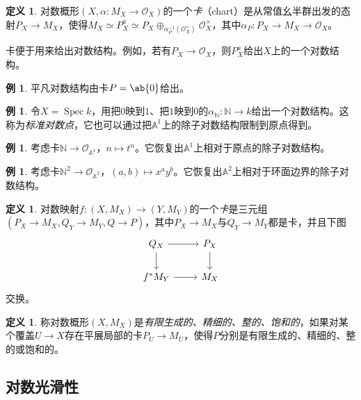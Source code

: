 \documentclass{amsart}
\theoremstyle{definition}
\newtheorem{defn}[thm]{定义}
\newtheorem{exm}[thm]{例}
\theoremstyle{remark}
\theoremstyle{plain}
\theoremstyle{definition}
\theoremstyle{remark}
\newcommand{\A}{\mathbb{A}}
\newcommand{\N}{\mathbb{N}}
\newcommand{\mc}[1]{\mathcal{#1}}
\newcommand{\1}{\mathbf{1}}
\newcommand{\2}{\mathbf{2}}
\newcommand{\3}{\mathbf{3}}
\DeclareMathOperator{\Spec}{Spec}
\begin{document}
\begin{defn}
    对数概形\((X, \alpha \colon M_X \to \mc{O}_X)\)的一个\textit{卡}（chart）是从常值幺半群出发的态射\(P_X \to M_X\)，使得\(M_X \simeq P_X^a \simeq P_X \oplus_{\alpha_P^{-1}(\mc{O}_X^{\times})} \mc{O}_X^{\times}\)，其中\(\alpha_P \colon P_X \to M_X \to \mc{O}_X\)。
\end{defn}

卡便于用来给出对数结构。例如，若有\(P_X \to \mc{O}_X\)，则\(P_X^a\)给出\(X\)上的一个对数结构。

\begin{exm}
    平凡对数结构由卡\(P = \ab\{0\}\)给出。
\end{exm}

\begin{exm}
    令\(X = \Spec k\)，用把\(0\)映到\(1\)、把\(1\)映到\(0\)的\(\alpha_{\N} \colon \N \to k\)给出一个对数结构。这称为\textit{标准对数点}，它也可以通过把\(\A^1\)上的除子对数结构限制到原点得到。
\end{exm}

\begin{exm}
    考虑卡\(\N \to \mc{O}_{\A^1}\)，\(n \mapsto t^n\)。它恢复出\(\A^1\)上相对于原点的除子对数结构。
\end{exm}

\begin{exm}
    考虑卡\(\N^2 \to \mc{O}_{\A^2}\)，\((a,b) \mapsto x^a y^b\)。它恢复出\(\A^2\)上相对于环面边界的除子对数结构。
\end{exm}

\begin{defn}
    对数映射\(f \colon (X, M_X) \to (Y, M_Y)\)的一个\textit{卡}是三元组\((P_X\to M_X, Q_Y \to M_Y, Q \to P)\)，其中\(P_X \to M_X\)与\(Q_Y \to M_Y\)都是卡，并且下图
    \begin{equation*}
    \begin{tikzcd}
        Q_X \ar{r} \ar{d} & P_X \ar{d} \\
        f^* M_Y \ar{r} & M_X
    \end{tikzcd}
    \end{equation*}
    交换。
\end{defn}

\begin{defn}
    称对数概形\((X, M_X)\)是\textit{有限生成的、精细的、整的、饱和的}，如果对某个覆盖\(U \to X\)存在平展局部的卡\(P_U \to M_U\)，使得\(P\)分别是有限生成的、精细的、整的或饱和的。
\end{defn}

\subsection{对数光滑性}%
\label{sub:Log smoothness}
\end{document}

